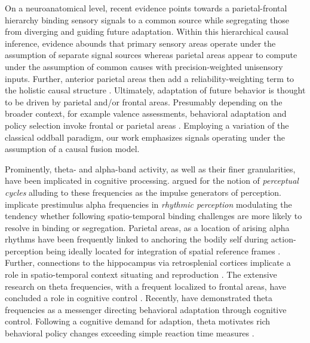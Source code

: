 On a neuroanatomical level, recent evidence points towards a parietal-frontal hierarchy binding sensory signals to a common source while segregating those from diverging and guiding future adaptation. Within this hierarchical causal inference, evidence abounds that primary sensory areas operate under the assumption of separate signal sources whereas parietal areas appear to compute under the assumption of common causes with precision-weighted unisensory inputs. Further, anterior parietal areas then add a reliability-weighting term to the holistic causal structure \cite{Cao2019, Rohe2019, Cohen2013a}. Ultimately, adaptation of future behavior is thought to be driven by parietal and/or frontal areas. Presumably depending on the broader context, for example valence assessments, behavioral adaptation and policy selection invoke frontal or parietal areas \cite{Pearson2011, Kolling2016, Holroyd2002}. Employing a variation of the classical oddball paradigm, our work emphasizes signals operating under the assumption of a causal fusion model.

Prominently, theta- and alpha-band activity, as well as their finer granularities, have been implicated in cognitive processing. \citet{VanRullen2016} argued for the notion of \textit{perceptual cycles} alluding to these frequencies as the impulse generators of perception. \citet{Rohe2019} implicate prestimulus alpha frequencies in \textit{rhythmic perception} modulating the tendency whether following spatio-temporal binding challenges are more likely to resolve in binding or segregation. Parietal areas, as a location of arising alpha rhythms have been frequently linked to anchoring the bodily self during action-perception being ideally located for integration of spatial reference frames \cite{Blanke2015, Guterstam2015a, Halgren2019}. Further, connections to the hippocampus via retrosplenial cortices implicate a role in spatio-temporal context situating and reproduction \cite{Pearson2011, Clark2018, Gramann2009, Friston2016a}. The extensive research on theta frequencies, with a frequent localized to frontal areas, have concluded a role in cognitive control \cite{Cavanagh2014}. Recently, \citet{Duprez2020} have demonstrated theta frequencies as a messenger directing behavioral adaptation through cognitive control. Following a cognitive demand for adaption, theta motivates rich behavioral policy changes exceeding simple reaction time measures \cite{Cooper2019}. 













